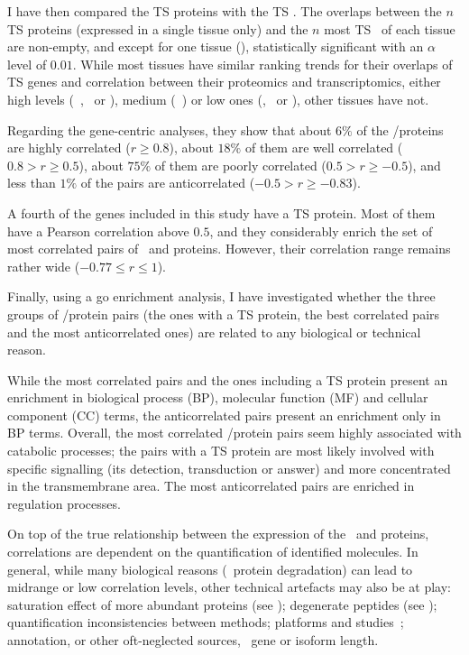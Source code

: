 I have then compared the \gls{TS} proteins with the \gls{TS} \mRNAs{}.
The overlaps between the $n$ \gls{TS} proteins (expressed in a single tissue only)
and the $n$ most \gls{TS} \mRNAs\ of each tissue are non-empty,
and except for one tissue (\urinarybladder),
statistically significant with an $\alpha$ level of $0.01$.
While most tissues have similar ranking trends for their overlaps of \gls{TS} genes
and correlation between their proteomics and transcriptomics,
either high levels (\eg\ \liver, \testis\ or \pancreas),
medium (\eg\ \prostate)
or low ones (\urinarybladder, \lung\ or \gallbladder),
other tissues have not.\mybr\

Regarding the gene-centric analyses,
they show that
about $6\%$ of the \mRNAs/proteins are highly correlated ($r≥0.8$),
about $18\%$ of them are well correlated ($0.8 > r ≥ 0.5$),
about $75\%$ of them are poorly correlated ($0.5 > r ≥ -0.5$), and
less than $1\%$ of the pairs are anticorrelated ($-0.5 > r ≥ -0.83$).\mybr\

A fourth of the genes included in this study have a \gls{TS} protein.
Most of them have a Pearson correlation above $0.5$, and
they considerably enrich the set of most correlated pairs of \mRNAs\ and proteins.
However, their correlation range remains rather wide ($-0.77 ≤ r≤ 1$).\mybr\

Finally, using a \gls{go} enrichment analysis,
I have investigated whether the three groups of \mRNA/protein pairs
(the ones with a \gls{TS} protein, the best correlated pairs
and the most anticorrelated ones) are related to
any biological or technical reason.\mybr\

While the most correlated pairs and the ones including a \gls{TS} protein
present an enrichment in biological process (BP),
molecular function (MF) and cellular component (CC) terms,
the anticorrelated pairs present an enrichment only in BP terms.
Overall, the most correlated \mRNA/protein pairs seem highly associated
with catabolic processes;
the pairs with a \gls{TS} protein are most likely involved
with specific signalling (its detection, transduction or answer)
and more concentrated in the transmembrane area.
The most anticorrelated pairs are enriched in regulation processes.\mybr\

On top of the true relationship between the expression of the \mRNAs\ and proteins,
correlations are dependent on the quantification of identified molecules.
In general,
while many biological reasons (\eg\ protein degradation)
can lead to midrange or low correlation levels,
other technical artefacts may also be at play:
saturation effect of more abundant proteins (see );
degenerate peptides (see );
quantification inconsistencies between methods;
platforms and studies~;
annotation,
or other oft-neglected sources, \eg\ gene or isoform length.\mybr\


